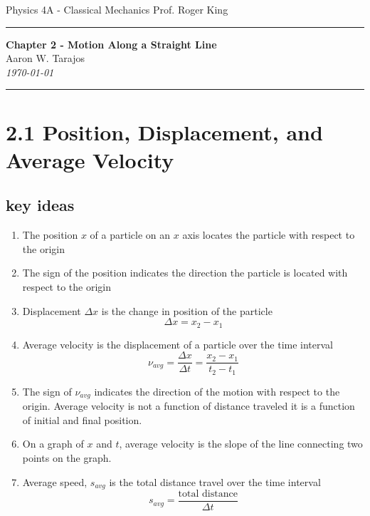 \documentclass{article}
\begin{document}
\noindent
Physics 4A - Classical Mechanics \hfill Prof. Roger King

\noindent\rule{\textwidth}{0.4pt}

\begin{center}
    \textbf{\LARGE Chapter 2 - Motion Along a Straight Line} \\
    \vspace{12pt}
    \large Aaron W. Tarajos \\
    \textit{\today}
\end{center}

\noindent\rule{\textwidth}{0.4pt}

\section*{2.1 Position, Displacement, and Average Velocity}
\subsection*{key ideas}
\begin{enumerate}
	\item The position $x$ of a particle on an $x$ axis locates the particle with respect to the origin
	\item The sign of the position indicates the direction the particle is located with respect to the origin
	\item Displacement $\Delta x$ is the change in position of the particle
		\[
			\Delta x = x_2-x_1
		\]
	\item Average velocity is the displacement of a particle over the time interval
		\[
			\nu_{avg} = \frac{\Delta x}{\Delta t} = \frac{x_2 - x_1}{t_2 - t_1}
		\]
	\item The sign of $\nu_{avg}$ indicates the direction of the motion with respect to the origin. Average velocity is not a function of distance traveled it is a function of initial and final position.
	\item On a graph of $x$ and $t$, average velocity is the slope of the line connecting two points on the graph.
	\item Average speed, $s_{avg}$ is the total distance travel over the time interval
		\[
			s_{avg} = \frac{\text{total distance}}{\Delta t}
		\]
\end{enumerate}
\end{document}
